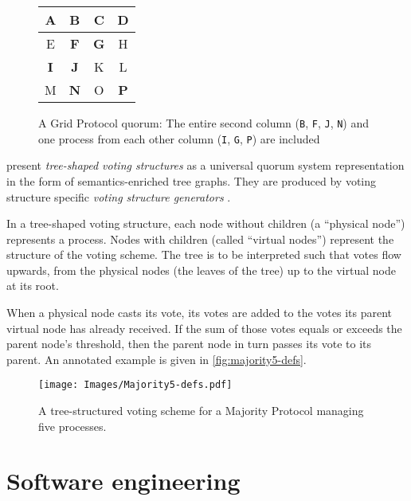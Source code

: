 \documentclass[draft,11pt,chapterprefix=true,toc=bibliography,numbers=noendperiod,
               footnotes=multiple,twoside]{scrreprt}
\newcommand{\voted}[1]{\textbf{\color{black}#1}}
\begin{document}
\begin{figure}[h]
    \centering
    {\ttfamily\color{gray}
    \begin{tabular}{c | c | c | c}
        A & \voted{B} & C & D \\
        \hline
        E & \voted{F} & \voted{G} & H \\
        \hline
        \voted{I} & \voted{J} & K & L \\
        \hline
        M & \voted{N} & O & \voted{P} \\
    \end{tabular}
    }
    \caption[Grid protocol quorum table]{A Grid Protocol quorum: The entire second column (\texttt{B}, \texttt{F}, \texttt{J}, \texttt{N}) and one process from each other column (\texttt{I}, \texttt{G}, \texttt{P}) are included}
    \label{fig:grid-quorum}
\end{figure}


\citeauthor{generators} present \emph{tree-shaped voting structures} as a universal quorum system representation in the form of semantics-enriched tree graphs. They are produced by voting structure specific \emph{voting structure generators} \autocite{generators}.

In a tree-shaped voting structure, each node without children (a \enquote{physical node}) represents a process. Nodes with children (called \enquote{virtual nodes}) represent the structure of the voting scheme. The tree is to be interpreted such that votes flow upwards, from the physical nodes (the leaves of the tree) up to the virtual node at its root.

When a physical node casts its vote, its votes are added to the votes its parent virtual node has already received. If the sum of those votes equals or exceeds the parent node's threshold, then the parent node in turn passes its vote to its parent. An annotated example is given in \autoref{fig:majority5-defs}.

\begin{figure}[h]
    \centering
    \texttt{[image: Images/Majority5-defs.pdf]}
    \caption[Tree-structured voting scheme for a Majority Protocol]{A tree-structured voting scheme for a Majority Protocol managing five processes.}
    \label{fig:majority5-defs}
\end{figure}

\section{Software engineering\label{sc:software-engineering}}
\end{document}
